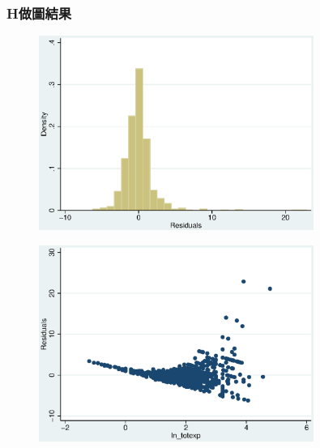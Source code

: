 \begin{frame}[allowframebreaks]
    \frametitle{H做圖結果}
    \begin{figure}
        \includegraphics[width = 0.8\textwidth]{../Results/Q4_11_hist_3.eps}
    \end{figure}
    \begin{figure}
        \includegraphics[width = 0.8\textwidth]{../Results/Q4_11_scatter_3.eps}
    \end{figure}
\end{frame}

